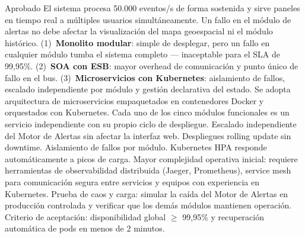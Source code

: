 \documentclass[12pt, letterpaper]{article}
\begin{document}
  {Aprobado}
  {El sistema procesa 50.000 eventos/s de forma sostenida y sirve paneles en tiempo
   real a múltiples usuarios simultáneamente. Un fallo en el módulo de alertas no debe
   afectar la visualización del mapa geoespacial ni el módulo histórico.}
  {(1)~\textbf{Monolito modular}: simple de desplegar, pero un fallo en cualquier
   módulo tumba el sistema completo --- inaceptable para el SLA de 99,95\%.
   (2)~\textbf{SOA con ESB}: mayor overhead de comunicación y punto único de fallo en
   el bus.
   (3)~\textbf{Microservicios con Kubernetes}: aislamiento de fallos, escalado
   independiente por módulo y gestión declarativa del estado.}
  {Se adopta arquitectura de microservicios empaquetados en contenedores Docker y
   orquestados con Kubernetes. Cada uno de los cinco módulos funcionales es un servicio
   independiente con su propio ciclo de despliegue.}
  {Escalado independiente del Motor de Alertas sin afectar la interfaz web. Despliegues
   rolling update sin downtime. Aislamiento de fallos por módulo. Kubernetes HPA
   responde automáticamente a picos de carga.}
  {Mayor complejidad operativa inicial: requiere herramientas de observabilidad
   distribuida (Jaeger, Prometheus), service mesh para comunicación segura entre
    servicios y equipos con experiencia en Kubernetes.}
    {Prueba de caos y carga: simular la caída del Motor de Alertas en producción
    controlada y verificar que los demás módulos mantienen operación. Criterio de
    aceptación: disponibilidad global $\geq$ 99,95\% y recuperación automática de pods
    en menos de 2 minutos.}
\end{document}
